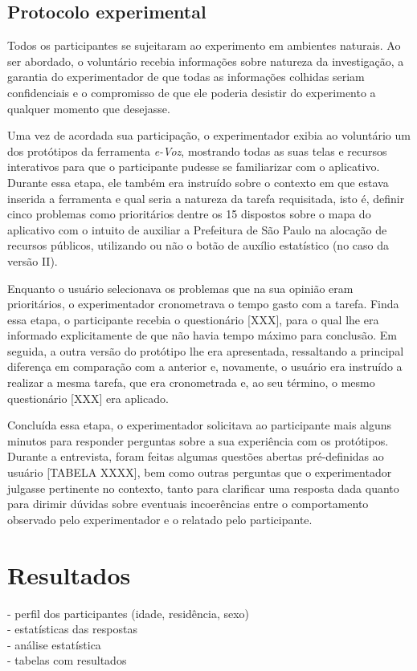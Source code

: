 \documentclass{sigchi}
\begin{document}
\subsection{Protocolo experimental}
Todos os participantes se sujeitaram ao experimento em ambientes naturais. Ao ser abordado, o voluntário recebia informações sobre natureza da investigação, a garantia do experimentador de que todas as informações colhidas seriam confidenciais e o compromisso de que ele poderia desistir do experimento a qualquer momento que desejasse.

Uma vez de acordada sua participação, o experimentador exibia ao voluntário um dos protótipos da ferramenta \textit{e-Voz}, mostrando todas as suas telas e recursos interativos para que o participante pudesse se familiarizar com o aplicativo. Durante essa etapa, ele também era instruído sobre o contexto em que estava inserida a ferramenta e qual seria a natureza da tarefa requisitada, isto é, definir cinco problemas como prioritários dentre os 15 dispostos sobre o mapa do aplicativo com o intuito de auxiliar a Prefeitura de São Paulo na alocação de recursos públicos, utilizando ou não o botão de auxílio estatístico (no caso da versão II).

Enquanto o usuário selecionava os problemas que na sua opinião eram prioritários, o experimentador cronometrava o tempo gasto com a tarefa. Finda essa etapa, o participante recebia o questionário [XXX], para o qual lhe era informado explicitamente de que não havia tempo máximo para conclusão. Em seguida, a outra versão do protótipo lhe era apresentada, ressaltando a principal diferença em comparação com a anterior e, novamente, o usuário era instruído a realizar a mesma tarefa, que era cronometrada e, ao seu término, o mesmo questionário [XXX] era aplicado.

Concluída essa etapa, o experimentador solicitava ao participante mais alguns minutos para responder perguntas sobre a sua experiência com os protótipos. Durante a entrevista, foram feitas algumas questões abertas pré-definidas ao usuário [TABELA XXXX], bem como outras perguntas que o experimentador julgasse pertinente no contexto, tanto para clarificar uma resposta dada quanto para dirimir dúvidas sobre eventuais incoerências entre o comportamento observado pelo experimentador e o relatado pelo participante.



\section{Resultados}
- perfil dos participantes (idade, residência, sexo)\\
- estatísticas das respostas\\
- análise estatística\\
- tabelas com resultados\\
\end{document}
